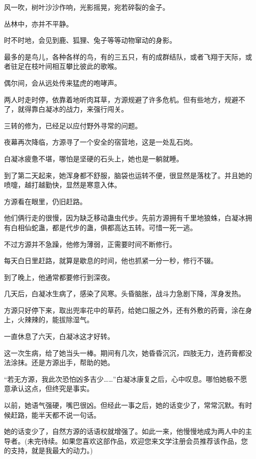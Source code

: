 \begin{this_body}
风一吹，树叶沙沙作响，光影摇晃，宛若碎裂的金子。

丛林中，亦并不平静。

时不时地，会见到鹿、狐狸、兔子等等动物窜动的身影。

最多的是鸟儿，各种各样的鸟，有的三五只，有的成群结队，或者飞翔于天际，或者驻足在枝叶间相互攀比彼此的歌喉。

偶尔间，会从远处传来猛虎的咆哮声。

两人时走时停，依靠着地听肉耳草，方源规避了许多危机。但有些地方，规避不了，就得靠白凝冰的战力，来强行闯关。

三转的修为，已经足以应付野外寻常的问题。

夜幕再次降临，方源寻了一个安全的宿营地，这是一处乱石岗。

白凝冰疲惫不堪，哪怕是坚硬的石头上，她也是一躺就睡。

到了第二天起来，她浑身都不舒服，脑袋也运转不便，很显然是落枕了。并且她的喷嚏，越打越勤快，显然是寒意入体。

方源看在眼里，仍旧赶路。

他们俩行走的很慢，因为缺乏移动蛊虫代步。先前方源拥有千里地狼蛛，白凝冰拥有白相仙蛇蛊，都是代步的蛊，俱都高达五转。可惜一死一逃。

不过方源并不急躁，他修为薄弱，正需要时间不断修行。

每天白日里赶路，就算是歇息的时间，他也抓紧一分一秒，修行不辍。

到了晚上，他通常都要修行到深夜。

几天后，白凝冰生病了，感染了风寒。头昏脑胀，战斗力急剧下降，浑身发热。

方源只好停下来，取出兜率花中的草药，给她口服之外，还有外敷的药膏，涂在身上，火辣辣的，能拔除湿气。

一直休息了六天，白凝冰这才好转。

这一次生病，给了她当头一棒。期间有几次，她昏昏沉沉，四肢无力，连药膏都没法涂抹。还是方源出手，帮助的她。

“若无方源，我此次恐怕凶多吉少……”白凝冰康复之后，心中叹息。哪怕她极不愿意承认这点，但终究是事实。

以前，她语气强硬，嘴巴很凶。但经此一事之后，她的话变少了，常常沉默。有时候赶路，能半天都不说一句话。

她的话变少了，自然方源的话语权就增强了。如此一来，他慢慢地成为两人中的主导者。(未完待续。如果您喜欢这部作品，欢迎您来文学注册会员推荐该作品，您的支持，就是我最大的动力。)

\end{this_body}

